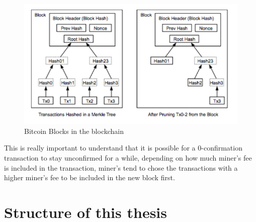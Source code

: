 \begin{figure}
\centering
\includegraphics[width=\linewidth]{fig/bitcoinblocks.png}
  \caption{Bitcoin Blocks in the blockchain ~\cite{Nak08}}
\label{fig:bitcoinblocks}
\end{figure}

This is really important to understand that it is possible for a 0-confirmation transaction to stay unconfirmed for a while, depending on how much miner's fee is included in the transaction, miner's tend to chose the transactions with a higher miner's fee to be included in the new block first.


\section{Structure of this thesis}



